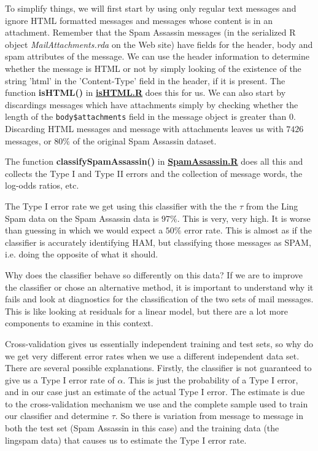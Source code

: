 \documentclass{article}
\def\SFunction#1{\textbf{#1()}}
\def\SVariable#1{\textsl{#1}}
\def\Sexpression#1{\texttt{#1}}
\def\file#1{\HREF{http://winnie.ucdavis.edu/stat141/Winter04/Homework/NaieveBayes/Solutions/#1}{\textbf{#1}}}
\def\HREF#1#2{\href{#1}{#2}}
\begin{document}
To simplify things, we will first start by using only regular text
messages and ignore HTML formatted messages and messages whose content
is in an attachment.  Remember that the Spam Assassin messages (in the
serialized R object \SVariable{MailAttachments.rda} on the Web site)
have fields for the header, body and spam attributes of the message.
We can use the header information to determine whether the message is
HTML or not by simply looking of the existence of the string 'html' in
the 'Content-Type' field in the header, if it is present.  The
function \SFunction{isHTML} in \file{isHTML.R} does this for us.  We
can also start by discardings messages which have attachments simply
by checking whether the length of the \Sexpression{body\$attachments}
field in the message object is greater than $0$.  Discarding HTML
messages and message with attachments leaves us with $7426$ messages,
or $80\%$ of the original Spam Assassin dataset.

The function \SFunction{classifySpamAssassin} in \file{SpamAssassin.R}
does all this and collects the Type I and Type II errors and the
collection of message words, the log-odds ratios, etc.

The Type I error rate we get using this classifier with the the $\tau$
from the Ling Spam data on the Spam Assassin data is $97\%$.  This is
very, very high.  It is worse than guessing in which we would expect a
$50\%$ error rate.  This is almost as if the classifier is accurately
identifying HAM, but classifying those messages as SPAM, i.e. doing
the opposite of what it should.


Why does the classifier behave so differently on this data?  If we are
to improve the classifier or chose an alternative method, it is
important to understand why it fails and look at diagnostics for the
classification of the two sets of mail messages.  This is like looking
at residuals for a linear model, but there are a lot more components
to examine in this context.

Cross-validation gives us essentially independent training and test
sets, so why do we get very different error rates when we use a
different independent data set.  There are several possible
explanations.  Firstly, the classifier is not guaranteed to give us a
Type I error rate of $\alpha$. This is just the probability of a Type
I error, and in our case just an estimate of the actual Type I error.
The estimate is due to the cross-validation mechanism we use and the
complete sample used to train our classifier and determine $\tau$.  So
there is variation from message to message in both the test set (Spam
Assassin in this case) and the training data (the lingspam data) that
causes us to estimate the Type I error rate.
\end{document}
